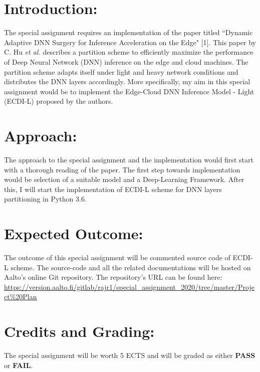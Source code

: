 \documentclass{article}
\begin{document}
    \begin{normalsize}
    
    	\section{Introduction:}
         The special assignment requires an implementation of the paper titled ``Dynamic Adaptive DNN Surgery for Inference Acceleration on the Edge" [1]. This paper by C. Hu \textit{et al.} describes a partition scheme to efficiently maximize the performance of Deep Neural Network (DNN) inference on the edge and cloud machines. The partition scheme adapts itself under light and heavy network conditions and distributes the DNN layers accordingly. More specifically, my aim in this special assignment would be to implement the Edge-Cloud DNN Inference Model - Light (ECDI-L) proposed by the authors.       

        
	   	\section{Approach:}
        
      	The approach to the special assignment and the implementation would first start with a thorough reading of the paper. The first step towards implementation would be selection of a suitable model and a Deep-Learning Framework. After this, I will start the implementation of ECDI-L scheme for DNN layers partitioning in Python 3.6. 
      	
      	\section{Expected Outcome:}
      	
      	The outcome of this special assignment will be  commented source code of ECDI-L scheme. The source-code and all the related documentations will be hosted on Aalto's online Git repository. The repository's URL can be found here: \underline{\href{version.aalto.fi/gitlab/rajr1/special\_assignment\_2020/tree/master/Project\%20Plan}{https://version.aalto.fi/gitlab/rajr1/special\_assignment\_2020/tree/master/Project\%20Plan}}
      	
      	\section{Credits and Grading:}
      	
      	The special assignment will be worth 5 ECTS and will be graded as either \textbf{PASS}  or \textbf{FAIL}.      	
      	

\end{normalsize}
\end{document}
